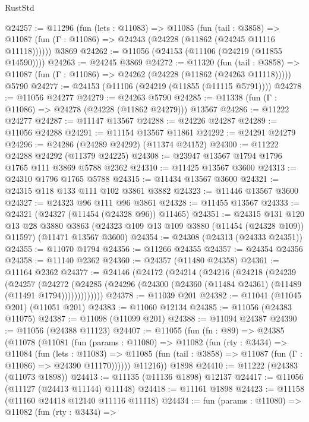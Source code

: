 \begin{lexlean}{RustStd}
\begin{coremodule}
@24257 := @11296
    (fun (lets : @11083) =>
    @11085
      (fun (tail : @3858) =>
      @11087 (fun (Γ : @11086) => @24243 (@24228 (@11862 (@24245 @11116 @11118))))))
    @3869
@24262 := @11056 (@24153 (@11106 (@24219 (@11855 @14590))))
@24263 := @24245 @3869
@24272 := @11320
    (fun (tail : @3858) => @11087 (fun (Γ : @11086) => @24262 (@24228 (@11862 (@24263 @11118)))))
    @5790
@24277 := @24153 (@11106 (@24219 (@11855 (@11115 @5791))))
@24278 := @11056 @24277
@24279 := @24263 @5790
@24285 := @11338 (fun (Γ : @11086) => @24278 (@24228 (@11862 @24279))) @13567
@24286 := @11222 @24277
@24287 := @11147 @13567
@24288 := @24226 @24287
@24289 := @11056 @24288
@24291 := @11154 @13567 @11861
@24292 := @24291 @24279
@24296 := @24286 (@24289 @24292) (@11374 @24152)
@24300 := @11222 @24288 @24292 (@11379 @24225)
@24308 := @23947 @13567 @1794 @1796 @1765 @111 @3869 @5788 @2362
@24310 := @11425 @13567 @3600
@24313 := @24310 @1796 @1765 @5788
@24315 := @11434 @13567 @3600
@24321 := @24315 @118 @133 @111 @102 @3861 @3882
@24323 := @11446 @13567 @3600
@24327 := @24323 @96 @111 @96 @3861
@24328 := @11455 @13567
@24333 := @24321 (@24327 (@11454 (@24328 @96)) @11465)
@24351 := @24315
    @131
    @120
    @13
    @28
    @3880
    @3863
    (@24323 @109 @13 @109 @3880 (@11454 (@24328 @109)) @11597)
    (@11471 @13567 @3600)
@24354 := @24308 (@24313 (@24333 @24351))
@24355 := @11070 @1794
@24356 := @11266 @24355
@24357 := @24354 @24356
@24358 := @11140 @2362
@24360 := @24357 (@11480 @24358)
@24361 := @11164 @2362
@24377 := @24146
    (@24172
      (@24214
        (@24216
          (@24218
            (@24239
              (@24257
                (@24272
                  (@24285 (@24296 (@24300 (@24360 (@11484 @24361) (@11489 (@11491 @1794)))))))))))))
@24378 := @11039 @201
@24382 := @11041 (@11045 @201) (@11051 @201)
@24383 := @11060 @12134
@24385 := @11056 (@24383 @11075)
@24387 := @11098 (@11099 @201)
@24388 := @11094 @24387
@24390 := @11056 (@24388 @11123)
@24407 := @11055
    (fun (fn : @89) =>
    @24385
      (@11078
        (@11081
          (fun (params : @11080) =>
          @11082
            (fun (rty : @3434) =>
            @11084
              (fun (lets : @11083) =>
              @11085 (fun (tail : @3858) => @11087 (fun (Γ : @11086) => @24390 @11170))))))
        @11216))
    @1898
@24410 := @11222 (@24383 (@11073 @1898))
@24413 := @11135 (@11136 @1898) @12137
@24417 := @11056 (@11127 (@24413 @11144) @11148)
@24418 := @11161 @1898
@24423 := @11158 (@11160 @24418 @12140 @11116 @11118)
@24434 := fun (params : @11080) =>
  @11082
    (fun (rty : @3434) =>

\end{coremodule}
\end{lexlean}
